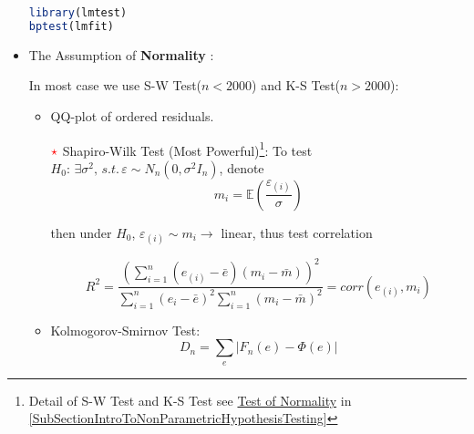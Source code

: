 \begin{itemize}[topsep=2pt,itemsep=2pt]
\begin{rcode}
\begin{lstlisting}[language=R]
library(lmtest)
bptest(lmfit)
\end{lstlisting}

\end{rcode}

    \item The Assumption of \textbf{Normality} :
    
    In most case we use S-W Test($ n<2000 $) and K-S Test($ n>2000 $):
    \begin{itemize}[topsep=2pt,itemsep=2pt]
        \item QQ-plot of ordered residuals.
        
        \item[$ {\color{red}\star}  $] Shapiro-Wilk Test (Most Powerful)\footnote{Detail of S-W Test and K-S Test see \hyperlink{testofnormality}{Test of Normality} in \autoref{SubSectionIntroToNonParametricHypothesisTesting}}: To test $ H_0: \,\exists \sigma ^2, \,s.t. \,\varepsilon \sim N_n(0,\sigma ^2I_n)  $, denote 
        \begin{equation}
            m_i=\mathbb{E}(\dfrac{\varepsilon _{(i)} }{\sigma }) 
        \end{equation}

        then under $H_0 $, $ \varepsilon _{(i)}\sim m_i \to $ linear, thus test correlation 
        
        \begin{equation}
            R^2=\dfrac{\left(\sum_{i=1}^n(e_{(i)}-\bar{e})(m_i-\bar{m})\right)^2}{\sum_{i=1}^n(e_{i}-\bar{e})^2\sum_{i=1}^n(m_i-\bar{m})^2}=corr(e_{(i)},m_i) 
        \end{equation}
        
        \item Kolmogorov-Smirnov Test: 
        \begin{equation}
            D_n=\sum_{e}|F_n(e)-\Phi(e)|
        \end{equation}
        

\end{itemize}
\end{itemize}
